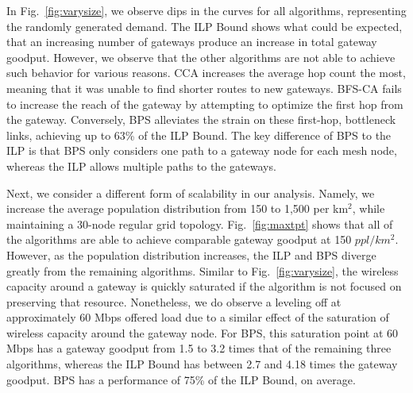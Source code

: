In Fig.~\ref{fig:varysize}, we observe dips in the curves for all algorithms, 
representing the randomly generated demand.  The ILP Bound shows what could be
expected, that an increasing number of gateways produce an increase in total
gateway goodput.  However, we observe that the other algorithms are not able
to achieve such behavior for various reasons.  CCA increases the average
hop count the most, meaning that it was unable to find shorter routes to new
gateways.  
BFS-CA fails to increase the reach of the gateway by attempting to optimize the first
hop from the gateway.
Conversely, BPS alleviates the strain on these first-hop, bottleneck 
links, achieving up to 63\% of the ILP Bound. The key difference of BPS to the
ILP is that BPS only considers one path to a gateway node for each mesh node,
whereas the ILP allows multiple paths to the gateways.

Next, we consider a different form of scalability in our analysis.  Namely,
we increase the average population distribution from 150 to 1,500 per km$^2$, while
maintaining a 30-node regular grid topology. Fig.~\ref{fig:maxtpt} shows that
all of the algorithms are able to achieve comparable gateway goodput at 150
$ppl/km^2$.  However, as the population distribution increases, the ILP
and BPS diverge greatly from the remaining algorithms. Similar to 
Fig.~\ref{fig:varysize}, the wireless capacity around a gateway is quickly 
saturated if the algorithm is not focused on preserving that resource. Nonetheless,
we do observe a leveling off at approximately 60 Mbps offered load due to a
similar effect of the saturation of wireless capacity around the gateway node.
For BPS, this saturation point at 60 Mbps has a gateway goodput from 1.5 to 3.2 
times that of the remaining three algorithms, whereas the ILP Bound has between
2.7 and 4.18 times the gateway goodput. BPS has a performance of 75\% of the ILP
Bound, on average.

 
